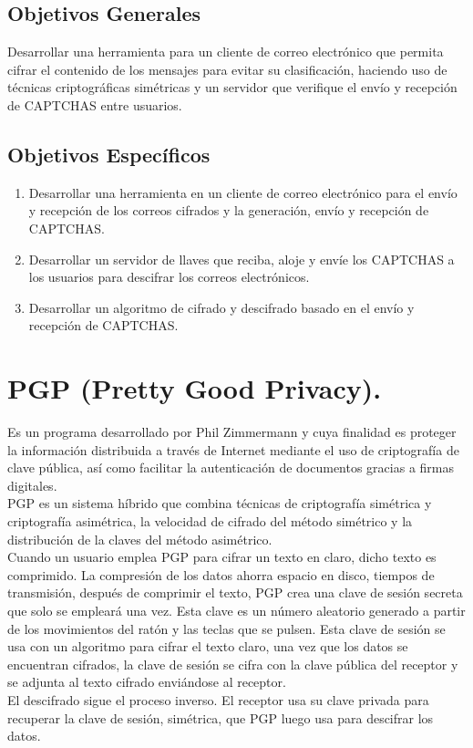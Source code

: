 \documentclass[12pt,oneside,onecolumn,openany]{report}
\begin{document}
    \subsection{Objetivos Generales} %
    
    
      Desarrollar  una  herramienta  para  un  cliente  de  correo  electrónico  que  permita  cifrar  el 
      contenido  de  los  mensajes  para  evitar  su  clasificación, haciendo uso de técnicas criptográficas simétricas y un servidor que verifique el envío y recepción de CAPTCHAS entre usuarios. 
    \subsection{Objetivos Específicos} %
    
    
        \begin{enumerate}
         \item Desarrollar  una  herramienta  en  un  cliente  de  correo  electrónico  para  el  envío  y recepción  de   los   correos  cifrados   y   la  generación,  envío  y  recepción  de CAPTCHAS. 
         \item Desarrollar un servidor de llaves que reciba, aloje y envíe los CAPTCHAS a los usuarios para descifrar los correos electrónicos.       
         \item Desarrollar un algoritmo de cifrado y descifrado basado en el envío y recepción de CAPTCHAS.
        \end{enumerate}

\section{PGP (Pretty Good Privacy).}
Es un programa desarrollado por Phil Zimmermann y cuya finalidad es proteger la información distribuida a través de Internet mediante el uso de criptografía de clave pública, así como facilitar la autenticación de documentos gracias a firmas digitales.\\
PGP es un sistema híbrido que combina técnicas de criptografía simétrica y criptografía asimétrica, la velocidad de cifrado del método simétrico y la distribución de la claves del método asimétrico.\\
Cuando un usuario emplea PGP para cifrar un texto en claro, dicho texto es comprimido. La compresión de los datos ahorra espacio en disco, tiempos de transmisión, después de comprimir el texto, PGP crea una clave de sesión secreta que solo se empleará una vez. Esta clave es un número aleatorio generado a partir de los movimientos del ratón y las teclas que se pulsen. Esta clave de sesión se usa con un algoritmo para cifrar el texto claro, una vez que los datos se encuentran cifrados, la clave de sesión se cifra con la clave pública del receptor y se adjunta al texto cifrado enviándose al receptor.\\
El descifrado sigue el proceso inverso. El receptor usa su clave privada para recuperar la clave de sesión, simétrica, que PGP luego usa para descifrar los datos.\cite{pgp}\\
\end{document}
